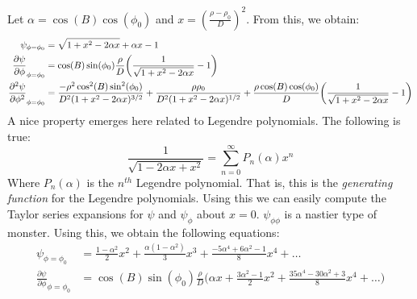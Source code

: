 \documentclass[crop=false,class=book,oneside]{standalone}
\begin{document}
            Let $\alpha=\cos(B)\cos(\phi_{0})$ and
            $x=(\frac{\rho-\rho_{0}}{D})^{2}$.
            From this, we obtain:
            \begin{align*}
                \psi_{\phi=\phi_{0}}
                &=\sqrt{1+x^{2}-2\alpha{x}}+\alpha{x}-1\\
                \frac{\partial\psi}
                     {\partial\phi}_{\phi=\phi_{0}}
                &=\cos(B)\sin(\phi_{0})\frac{\rho}{D}
                \bigg(
                    \frac{1}{\sqrt{1+x^{2}-2\alpha{x}}}-1
                \bigg)\\
                \frac{\partial^{2}\psi}
                     {\partial\phi^{2}}_{\phi=\phi_{0}}
                &=\frac{%
                      -\rho^{2}\cos^{2}(B)\sin^{2}(\phi_{0})
                  }{%
                    D^{2}(1+x^{2}-2\alpha{x})^{3/2}
                  }
                  +\frac{\rho\rho_{0}}
                        {D^{2}(1+x^{2}-2\alpha{x})^{1/2}}
                  +\frac{\rho\cos(B)\cos(\phi_{0})}
                        {D}
                  \bigg(
                      \frac{1}{\sqrt{1+x^{2}-2\alpha{x}}}-1
                  \bigg)
            \end{align*}
            A nice property emerges here related to
            Legendre polynomials. The following is true:
            \begin{equation*}
                \frac{1}{\sqrt{1-2\alpha{x}+x^{2}}}
                =\sum_{n=0}^{\infty}P_{n}(\alpha)x^{n}
            \end{equation*}
            Where $P_{n}(\alpha)$ is the $n^{th}$
            Legendre polynomial. That is, this is
            the \textit{generating function} for the
            Legendre polynomials. Using this we can
            easily compute the Taylor series expansions
            for $\psi$ and $\psi_{\phi}$ about $x=0$.
            $\psi_{\phi\phi}$ is a nastier type of monster.
            Using this, we obtain the following equations:
            \begin{align*}
                \psi_{\phi=\phi_{0}}
                &=\frac{1-\alpha^{2}}{2}x^{2}
                 +\frac{\alpha(1-\alpha^{2})}{3}x^{3}
                 +\frac{-5\alpha^{4}+6\alpha^{2}-1}{8}x^{4}+
                 \hdots\\
                  \frac{\partial\psi}
                       {\partial\phi}_{\phi=\phi_{0}}
                &=\cos(B)\sin(\phi_{0})\frac{\rho}{D}
                  \bigg(
                      \alpha{x}+\frac{3\alpha^{2}-1}{2}x^{2}
                      +\frac{35\alpha^{4}-30\alpha^{2}+3}{8}x^{4}
                      +\hdots
                  \bigg)
            \end{align*}
\end{document}

